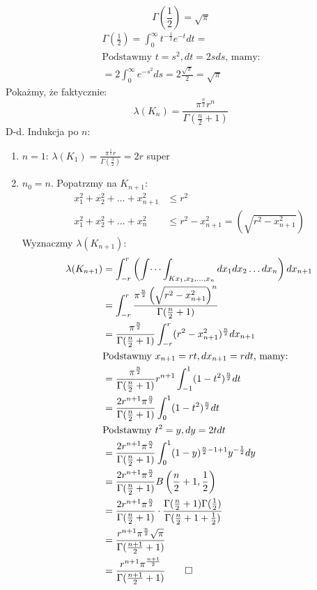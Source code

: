 \documentclass{article}
\theoremstyle{definition}
\theoremstyle{definition}
\theoremstyle{definition}
\theoremstyle{definition}
\theoremstyle{definition}
\theoremstyle{definition}
\theoremstyle{definition}
\begin{document}
\[\Gamma\left(\frac{1}{2}\right) = \sqrt{\pi}\]
\begin{align}
    \Gamma\left(\frac{1}{2}\right) = \int_{0}^{\infty} t^{-\frac{1}{2}} e^{-t} dt=\\
    \text{Podstawmy } t=s^2, dt=2sds \text{, mamy:}\\
    =2\int_{0}^{\infty} e^{-s^2} ds = 2 \frac{\sqrt{\pi}}{2} = \sqrt{\pi}
\end{align}
Pokażmy, że faktycznie:
\[\lambda(K_n) = \frac{\pi^{\frac{n}{2}}r^n}{\Gamma(\frac{n}{2}+1)}\]
D-d. Indukcja po $n$:
\begin{enumerate}
    \item $n=1$:
    $\lambda(K_1)=\frac{\pi^{\frac{1}{2}}r}{\Gamma\left(\frac{3}{2}\right)}=2r$ super
    \item $n_0=n$. Popatrzmy na $K_{n+1}$:
    \begin{align}
        x_1^2+x_2^2+\dots+x_{n+1}^2 &\leq r^2\\
        x_1^2+x_2^2+\dots+x_n^2 &\leq r^2-x_{n+1}^2 = \left(\sqrt{r^2-x_{n+1}^2}\right)
    \end{align}
    Wyznaczmy $\lambda(K_{n+1})$: 
    \begin{align}
        \lambda(K_{n+1}) &= \int_{-r}^{r} \left(\int \dots \int_{K x_1,x_2,\dots,x_n} dx_1 dx_2 \dots dx_n\right) dx_{n+1}\\
        &=\int_{-r}^{r} \frac{\pi^{\frac{n}{2}} \left(\sqrt{r^2-x_{n+1}^2}\right)^n}{\Gamma(\frac{n}{2}+1)}\\
        &=\frac{\pi^{\frac{n}{2}}}{\Gamma(\frac{n}{2}+1)} \int_{-r}^{r} (r^2-x_{n+1}^2)^{\frac{n}{2}} dx_{n+1}\\
        &\text {Podstawmy } x_{n+1}=rt, dx_{n+1} = rdt \text{, mamy:}\\
        &=\frac{\pi^{\frac{n}{2}}}{\Gamma(\frac{n}{2}+1)}r^{n+1} \int_{-1}^{1} (1-t^2)^{\frac{n}{2}} dt\\
        &=\frac{2r^{n+1}\pi^{\frac{n}{2}}}{\Gamma(\frac{n}{2}+1)} \int_{0}^{1} (1-t^2)^{\frac{n}{2}} dt\\
        &\text {Podstawmy } t^2=y, dy=2t dt\\
        &=\frac{2r^{n+1}\pi^{\frac{n}{2}}}{\Gamma(\frac{n}{2}+1)} \int_{0}^{1} (1-y)^{\frac{n}{2}-1+1} y^{-\frac{1}{2}} dy\\ 
        &=\frac{2r^{n+1}\pi^{\frac{n}{2}}}{\Gamma(\frac{n}{2}+1)} B\left(\frac{n}{2}+1,\frac{1}{2}\right)\\
        &=\frac{2r^{n+1}\pi^{\frac{n}{2}}}{\Gamma(\frac{n}{2}+1)} \cdot \frac{\Gamma(\frac{n}{2}+1)\Gamma(\frac{1}{2})}{\Gamma(\frac{n}{2} + 1 + \frac{1}{2})}\\
        &=\frac{r^{n+1} \pi^{\frac{n}{2}} \sqrt{\pi}}{\Gamma(\frac{n+1}{2}+1)}\\
        &=\frac{r^{n+1} \pi^{\frac{n+1}{2}}}{\Gamma(\frac{n+1}{2}+1)}\qed
    \end{align}
\end{enumerate}
\end{document}
